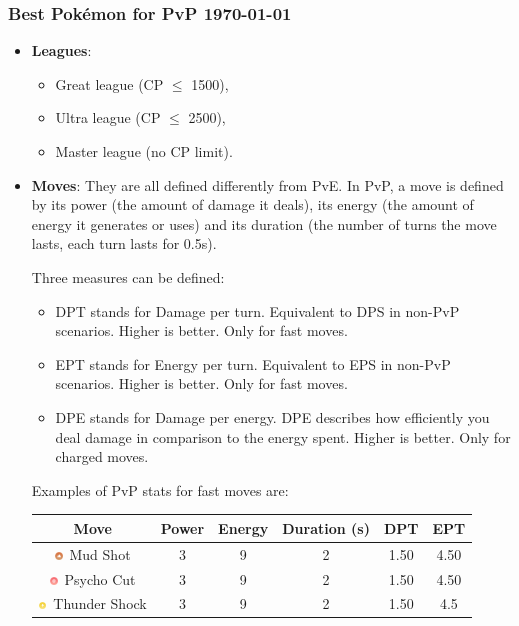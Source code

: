 \documentclass[12pt]{beamer}
\newcommand{\psysimp}{\includegraphics[height=0.2cm]{../../images/type/simplified/psy.png}}
\newcommand{\groundsimp}{\includegraphics[height=0.2cm]{../../images/type/simplified/ground.png}}
\newcommand{\electricsimp}{\includegraphics[height=0.2cm]{../../images/type/simplified/electric.png}}
\begin{document}
\begin{frame}
\frametitle{Best Pok\'emon for PvP \hspace{7cm} \today}

\begin{block}{}
\begin{footnotesize}
\begin{itemize}
  \item \textbf{Leagues}: 
  \begin{itemize}
  \item \footnotesize Great league (CP $\leq$ 1500), 
  \item \footnotesize Ultra league (CP $\leq$ 2500),
  \item \footnotesize Master league (no CP limit).
\end{itemize}
 \item \textbf{Moves}: They are all defined differently from PvE. In PvP, a move is defined by its power (the amount of damage it deals), its energy (the amount of energy it generates or uses) and its duration (the number of turns the move lasts, each turn lasts for 0.5s).
 
 Three measures can be defined:
 \begin{itemize} 
 \item \footnotesize DPT stands for Damage per turn. Equivalent to DPS in non-PvP scenarios. Higher is better. Only for fast moves.
 \item \footnotesize EPT stands for Energy per turn. Equivalent to EPS in non-PvP scenarios. Higher is better. Only for fast moves.
\item \footnotesize DPE stands for Damage per energy. DPE describes how efficiently you deal damage in comparison to the energy spent. Higher is better. Only for charged moves.
\end{itemize}

 Examples of PvP stats for fast moves are:
\begin{center}
\begin{tabular}{cccccc}
Move & Power & Energy & Duration (s) & DPT & EPT \\ \hline
\groundsimp~Mud Shot & 3& 9 &2 & 1.50 &4.50 \\
\psysimp~Psycho Cut & 3 & 9& 2 &1.50& 4.50 \\
\electricsimp~Thunder Shock & 3 & 9& 2 &1.50 &4.5 \\
\end{tabular}
\end{center}


\end{itemize}
\end{footnotesize}
\end{block}
\end{frame}
\end{document}
